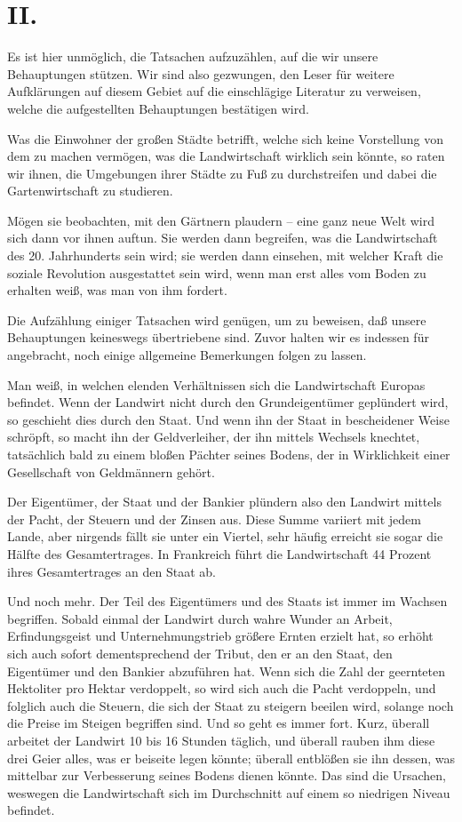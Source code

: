 \documentclass{scrbook}
\begin{document}
\section*{II.}

Es ist hier unmöglich, die Tatsachen aufzuzählen, auf die wir unsere Behauptungen stützen. Wir sind also gezwungen, den Leser für weitere Aufklärungen auf diesem Gebiet auf die einschlägige Literatur zu verweisen, welche die aufgestellten Behauptungen bestätigen wird.

Was die Einwohner der großen Städte betrifft, welche sich keine Vorstellung von dem zu machen vermögen, was die Landwirtschaft wirklich sein könnte, so raten wir ihnen, die Umgebungen ihrer Städte zu Fuß zu durchstreifen und dabei die Gartenwirtschaft zu studieren.

Mögen sie beobachten, mit den Gärtnern plaudern – eine ganz neue Welt wird sich dann vor ihnen auftun. Sie werden dann begreifen, was die Landwirtschaft des 20. Jahrhunderts sein wird; sie werden dann einsehen, mit welcher Kraft die soziale Revolution ausgestattet sein wird, wenn man erst alles vom Boden zu erhalten weiß, was man von ihm fordert.

Die Aufzählung einiger Tatsachen wird genügen, um zu beweisen, daß unsere Behauptungen keineswegs übertriebene sind. Zuvor halten wir es indessen für angebracht, noch einige allgemeine Bemerkungen folgen zu lassen.

Man weiß, in welchen elenden Verhältnissen sich die Landwirtschaft Europas befindet. Wenn der Landwirt nicht durch den Grundeigentümer geplündert wird, so geschieht dies durch den Staat. Und wenn ihn der Staat in bescheidener Weise schröpft, so macht ihn der Geldverleiher, der ihn mittels Wechsels knechtet, tatsächlich bald zu einem bloßen Pächter seines Bodens, der in Wirklichkeit einer Gesellschaft von Geldmännern gehört.

Der Eigentümer, der Staat und der Bankier plündern also den Landwirt mittels der Pacht, der Steuern und der Zinsen aus. Diese Summe variiert mit jedem Lande, aber nirgends fällt sie unter ein Viertel, sehr häufig erreicht sie sogar die Hälfte des Gesamtertrages. In Frankreich führt die Landwirtschaft 44 Prozent ihres Gesamtertrages an den Staat ab.

Und noch mehr. Der Teil des Eigentümers und des Staats ist immer im Wachsen begriffen. Sobald einmal der Landwirt durch wahre Wunder an Arbeit, Erfindungsgeist und Unternehmungstrieb größere Ernten erzielt hat, so erhöht sich auch sofort dementsprechend der Tribut, den er an den Staat, den Eigentümer und den Bankier abzuführen hat. Wenn sich die Zahl der geernteten Hektoliter pro Hektar verdoppelt, so wird sich auch die Pacht verdoppeln, und folglich auch die Steuern, die sich der Staat zu steigern beeilen wird, solange noch die Preise im Steigen begriffen sind. Und so geht es immer fort. Kurz, überall arbeitet der Landwirt 10 bis 16 Stunden täglich, und überall rauben ihm diese drei Geier alles, was er beiseite legen könnte; überall entblößen sie ihn dessen, was mittelbar zur Verbesserung seines Bodens dienen könnte. Das sind die Ursachen, weswegen die Landwirtschaft sich im Durchschnitt auf einem so niedrigen Niveau befindet.
\end{document}
